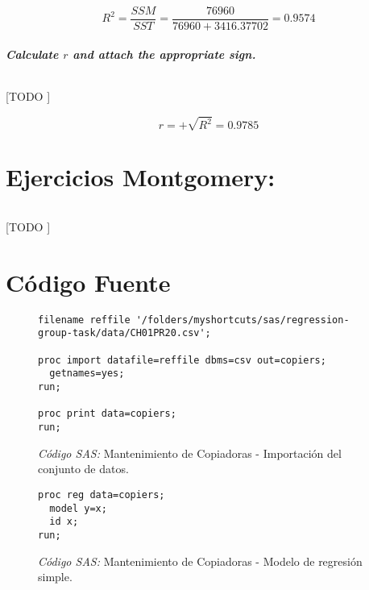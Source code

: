 \documentclass{article}
\begin{document}
        \begin{equation}
        \label{eq:copier-maintance-r-2}
          R^2 = \frac{SSM}{SST} = \frac{76960}{76960 + 3416.37702} = 0.9574
        \end{equation}

      \subsubsection{Calculate $r$ and attach the appropriate sign.}

        \paragraph{}
        [TODO ]

        \begin{equation}
          r = + \sqrt{R^2} = 0.9785
        \end{equation}

  \part{Ejercicios Montgomery:}

    \paragraph{}
    [TODO ]


  \part{Código Fuente}

    \begin{figure}[!h]
      \centering
      \begin{verbatim}
filename reffile '/folders/myshortcuts/sas/regression-group-task/data/CH01PR20.csv';

proc import datafile=reffile dbms=csv out=copiers;
  getnames=yes;
run;

proc print data=copiers;
run;
      \end{verbatim}
      \caption{\emph{Código SAS:} Mantenimiento de Copiadoras - Importación del conjunto de datos.}
      \label{code:sas-copiers-1}
    \end{figure}


    \begin{figure}[!h]
      \centering
      \begin{verbatim}
proc reg data=copiers;
  model y=x;
  id x;
run;
      \end{verbatim}
      \caption{\emph{Código SAS:} Mantenimiento de Copiadoras - Modelo de regresión simple.}
      \label{code:sas-copiers-2}
    \end{figure}
\end{document}
